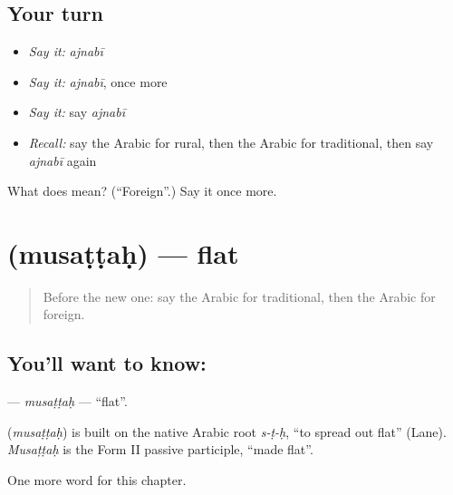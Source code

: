 \subsection*{Your turn}
\begin{itemize}
\raggedright
  \item \emph{Say it:} \emph{ajnabī}
  \item \emph{Say it:} \emph{ajnabī}, once more
  \item \emph{Say it:} say \emph{ajnabī}
  \item \emph{Recall:} say the Arabic for rural, then the Arabic for traditional, then say \emph{ajnabī} again
\end{itemize}

\begin{tcolorbox}[breakable,colback=teal!4,colframe=teal!35!black,title={Before you move on}]
What does  mean? (\textquotedblleft{}Foreign\textquotedblright{}.) Say it once more.
\end{tcolorbox}
\section[\texorpdfstring{\ar{مسطح} (musaṭṭaḥ)}{مسطح (musaṭṭaḥ)}]{ (musaṭṭaḥ) — flat}

\label{lesson:AR-C180-musattah}



\begin{quote}
Before the new one: say the Arabic for traditional, then the Arabic for foreign.
\end{quote}

\subsection*{You'll want to know: }
\textbf{} — \emph{musaṭṭaḥ} — \textquotedblleft{}flat\textquotedblright{}.

\begin{cousinweb}
\textbf{} (\emph{musaṭṭaḥ}) is built on the native Arabic root \emph{s-ṭ-ḥ}, \textquotedblleft{}to spread out flat\textquotedblright{} (Lane). \emph{Musaṭṭaḥ} is the Form II passive participle, \textquotedblleft{}made flat\textquotedblright{}.
\end{cousinweb}

\begin{grammarlens}[title={What you've built}]
One more word for this chapter.
\end{grammarlens}

